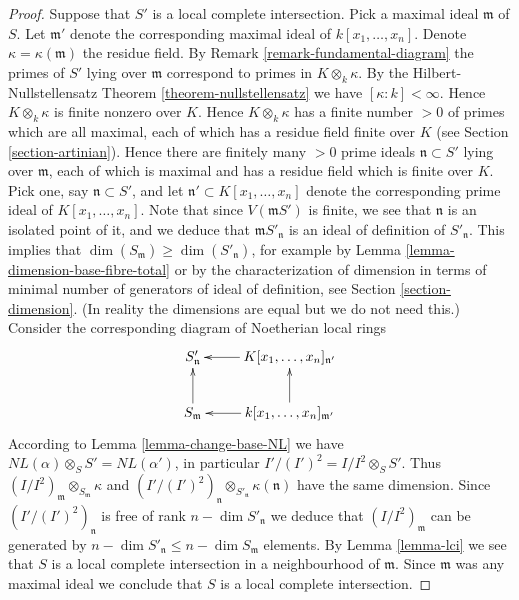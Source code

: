 \begin{proof}
\medskip\noindent
Suppose that $S'$ is a local complete intersection.
Pick a maximal ideal $\mathfrak m$ of $S$. Let $\mathfrak m'$
denote the corresponding maximal ideal of $k[x_1, \ldots, x_n]$.
Denote $\kappa = \kappa(\mathfrak m)$ the residue field.
By Remark \ref{remark-fundamental-diagram} the primes of
$S'$ lying over $\mathfrak m$ correspond to primes
in $K \otimes_k \kappa$. By the Hilbert-Nullstellensatz
Theorem \ref{theorem-nullstellensatz} we have $[\kappa : k] < \infty$.
Hence $K \otimes_k \kappa$ is finite nonzero over $K$.
Hence $K \otimes_k \kappa$ has a finite number $> 0$ of primes
which are all maximal, each of which has a residue field
finite over $K$ (see Section \ref{section-artinian}).
Hence there are finitely many $> 0$ prime ideals
$\mathfrak n \subset S'$ lying over $\mathfrak m$,
each of which is maximal and  has a residue field
which is finite over $K$. Pick one, say $\mathfrak n \subset S'$,
and let $\mathfrak n' \subset K[x_1, \ldots, x_n]$ denote the corresponding
prime ideal of $K[x_1, \ldots, x_n]$.
Note that since $V(\mathfrak mS')$ is finite, we see that
$\mathfrak n$ is an isolated point of it, and we
deduce that $\mathfrak mS'_{\mathfrak n}$ is an ideal of definition
of $S'_{\mathfrak n}$. This implies that $\dim(S_{\mathfrak m})
\geq \dim(S'_{\mathfrak n})$, for example by
Lemma \ref{lemma-dimension-base-fibre-total}
or by the characterization of dimension
in terms of minimal number of generators of ideal of definition,
see Section \ref{section-dimension}. (In reality the dimensions
are equal but we do not need this.)
Consider the corresponding diagram of Noetherian local rings
$$
\xymatrix{
S'_{\mathfrak n} &  K[x_1, \ldots, x_n]_{\mathfrak n'} \ar[l] \\
S_{\mathfrak m}\ar[u] &  k[x_1, \ldots, x_n]_{\mathfrak m'} \ar[u] \ar[l]
}
$$
According to Lemma \ref{lemma-change-base-NL} we have
$NL(\alpha) \otimes_S S' = NL(\alpha')$, in particular
$I'/(I')^2 = I/I^2 \otimes_S S'$. Thus
$(I/I^2)_{\mathfrak m} \otimes_{S_{\mathfrak m}} \kappa$
and
$(I'/(I')^2)_{\mathfrak n} \otimes_{S'_{\mathfrak n}} \kappa(\mathfrak n)$
have the same dimension. Since $(I'/(I')^2)_{\mathfrak n}$
is free of rank $n - \dim S'_{\mathfrak n}$ we deduce that
$(I/I^2)_{\mathfrak m}$ can be generated by
$n - \dim S'_{\mathfrak n} \leq n - \dim S_{\mathfrak m}$ elements.
By Lemma \ref{lemma-lci} we see that $S$ is a local
complete intersection in a neighbourhood of $\mathfrak m$.
Since $\mathfrak m$ was any maximal ideal we conclude that
$S$ is a local complete intersection.
\end{proof}

